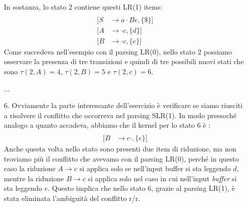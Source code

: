 \documentclass[class=book, crop=false, oneside, 12pt]{standalone}
\begin{document}
\begin{enumerate}
    In sostanza, lo stato 2 contiene questi LR(1) items:
    \begin{align*}
        [S &\to a \cdot Ad, \{\$\}] \\
        [S &\to a \cdot Be, \{\$\}] \\
        [A &\to \cdot c, \{d\}] \\
        [B &\to \cdot c, \{e\}]
    \end{align*}
    Come succedeva nell'esempio con il parsing LR(0), nello stato 2 possiamo osservare la presenza di tre transizioni e quindi di tre possibili nuovi stati che sono \(\tau(2,A)=4 \textrm{, } \tau(2,B)=5 \textrm{ e } \tau(2,c)=6\).
    \item[...]
    \item[6.] Ovviamente la parte interessante dell'esercizio è verificare se siamo riusciti a risolvere il conflitto che occorreva nel parsing SLR(1). In modo pressoché analogo a quanto accadeva, abbiamo che il kernel per lo stato 6 è :
    \begin{align*}
        [A &\to c \cdot, \{d\}] \\
        [B &\to c \cdot, \{e\}]
    \end{align*}
    Anche questa volta nello stato sono presenti due item di riduzione, ma non troviamo più il conflitto che avevamo con il parsing LR(0), perché in questo caso la riduzione \(A \to c\) si applica solo se nell'input buffer si sta leggendo \(d\), mentre la riduzione \(B \to c\) si applica solo nel caso in cui nell'input \emph{buffer} si sta leggendo \(e\). Questo implica che nello stato 6, grazie al parsing LR(1), è stata eliminata l'ambiguità del conflitto r/r.
\end{enumerate}
\end{document}
